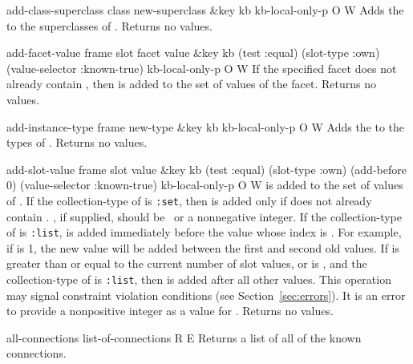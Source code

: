 

\begin{okbcop}{add-class-superclass}{ class new-superclass \&key kb kb-local-only-p} { \void } { O } { W } {  }
Adds the  to the superclasses of .
   Returns no values.
\end{okbcop}

\begin{okbcop}{add-facet-value}{ frame slot facet value \&key kb (test :equal) (slot-type :own) (value-selector :known-true) kb-local-only-p} { \void } { O } { W } {  }
If the specified facet does not already contain , 
   then  is added to the set of values of the facet.
   Returns no values.
\end{okbcop}

\begin{okbcop}{add-instance-type}{ frame new-type \&key kb kb-local-only-p} { \void } { O } { W } {  }
Adds the  to the types of .
   Returns no values.
\end{okbcop}

\begin{okbcop}{add-slot-value}{ frame slot value \&key kb (test :equal) (slot-type :own) (add-before 0) (value-selector :known-true) kb-local-only-p} { \void } { O } { W } {  }
 is added to the set of values of .  If the
   collection-type of  is {\tt :set}, then  is
   added only if  does not already contain .  
   , if supplied, should be \false\ or a nonnegative
   integer.  If the collection-type of
    is {\tt :list},  is added immediately before
   the value whose index is .  For example, if
    is 1, the new value will be added between the first
   and second old values.  If  is greater than or equal
   to the current number of slot values, or is \false, and the
   collection-type of  is {\tt :list}, then  is
   added after all other values.  This operation may signal constraint
   violation conditions (see Section~\ref{sec:errors}).  It is an error
   to provide a nonpositive integer as a value for .
   Returns no values.
\end{okbcop}

\begin{okbcop}{all-connections}{ } { list-of-connections } {   } { R } { E }
Returns a list of all of the known connections.
\end{okbcop}

